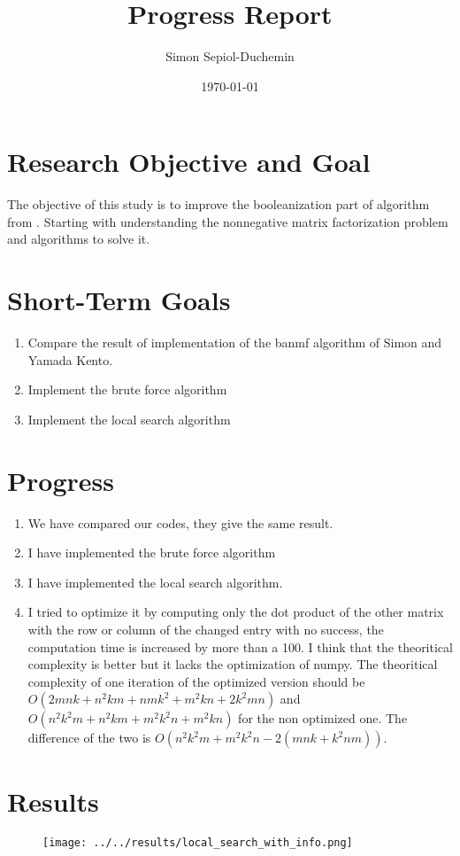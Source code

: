 \documentclass[a4paper,11pt]{article}
\title{Progress Report}
\author{Simon Sepiol-Duchemin}
\date{\today}
\begin{document}
%
\maketitle
\thispagestyle{empty}
%
\section{Research Objective and Goal}
The objective of this study is to improve the booleanization part of algorithm from \cite{9521203}. Starting with understanding the nonnegative matrix factorization problem and algorithms to solve it.
\section{Short-Term Goals}
\begin{enumerate}
\item Compare the result of implementation of the banmf algorithm of Simon and Yamada Kento.
\item Implement the brute force algorithm
\item Implement the local search algorithm 
\end{enumerate}
\section{Progress}
\begin{enumerate}
\item We have compared our codes, they give the same result.
\item I have implemented the brute force algorithm
\item I have implemented the local search algorithm.
\item I tried to optimize it by computing only the dot product of the other matrix with the row or column of the changed entry with no success, the computation time is increased by more than a 100. I think that the theoritical complexity is better but it lacks the optimization of numpy. The theoritical complexity of one iteration of the optimized version should be $O(2mnk + n^2km + nmk^2 + m^2kn +2k^2mn)$ and $O(n^2k^2m + n^2km+m^2k^2n+m^2kn)$ for the non optimized one. The difference of the two is $O(n^2k^2m+m^2k^2n - 2(mnk+k^2nm))$.
\end{enumerate}

\section{Results}
\begin{center}
    
\begin{figure}[H]
    \begin{center}
        \texttt{[image: ../../results/local\_search\_with\_info.png]}  
    \end{center}
\end{figure}
\end{center}





\end{document}
